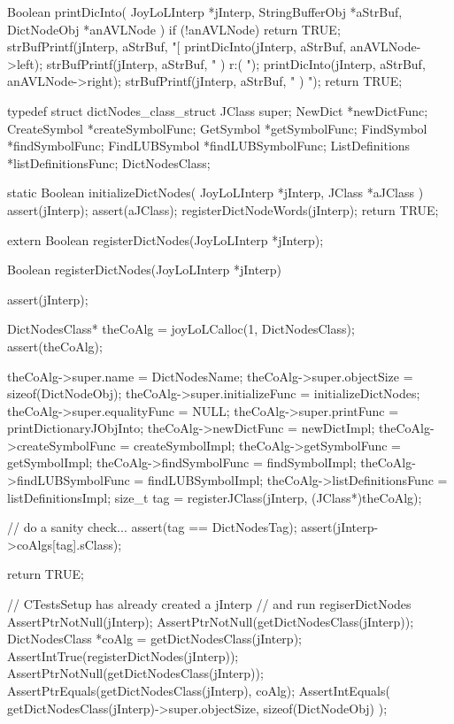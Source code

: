 Boolean printDicInto(
  JoyLoLInterp    *jInterp,
  StringBufferObj *aStrBuf,
  DictNodeObj         *anAVLNode
) {
  if (!anAVLNode) return TRUE;
  strBufPrintf(jInterp, aStrBuf, "[%
  printDicInto(jInterp, aStrBuf, anAVLNode->left);
  strBufPrintf(jInterp, aStrBuf, " ) r:( ");
  printDicInto(jInterp, aStrBuf, anAVLNode->right);
  strBufPrintf(jInterp, aStrBuf, " ) ");
  return TRUE;
}
\stopCCode

\startTestSuite[registerDictNodes]

\startCHeader
typedef struct dictNodes_class_struct {
  JClass super;
  NewDict         *newDictFunc;
  CreateSymbol    *createSymbolFunc;
  GetSymbol       *getSymbolFunc;
  FindSymbol      *findSymbolFunc;
  FindLUBSymbol   *findLUBSymbolFunc;
  ListDefinitions *listDefinitionsFunc;
} DictNodesClass;
\stopCHeader

\startCCode
static Boolean initializeDictNodes(
  JoyLoLInterp *jInterp,
  JClass   *aJClass
) {
  assert(jInterp);
  assert(aJClass);
  registerDictNodeWords(jInterp);
  return TRUE;
}
\stopCCode

\startCHeader
extern Boolean registerDictNodes(JoyLoLInterp *jInterp);
\stopCHeader
{}

\startCCode
Boolean registerDictNodes(JoyLoLInterp *jInterp) {
  assert(jInterp);
  
  DictNodesClass* theCoAlg =
    joyLoLCalloc(1, DictNodesClass);
  assert(theCoAlg);
  
  theCoAlg->super.name            = DictNodesName;
  theCoAlg->super.objectSize      = sizeof(DictNodeObj);
  theCoAlg->super.initializeFunc  = initializeDictNodes;
  theCoAlg->super.equalityFunc    = NULL;
  theCoAlg->super.printFunc       = printDictionaryJObjInto;
  theCoAlg->newDictFunc           = newDictImpl;
  theCoAlg->createSymbolFunc      = createSymbolImpl;
  theCoAlg->getSymbolFunc         = getSymbolImpl;
  theCoAlg->findSymbolFunc        = findSymbolImpl;
  theCoAlg->findLUBSymbolFunc     = findLUBSymbolImpl;
  theCoAlg->listDefinitionsFunc   = listDefinitionsImpl;
  size_t tag =
    registerJClass(jInterp, (JClass*)theCoAlg);
  
  // do a sanity check...
  assert(tag == DictNodesTag);
  assert(jInterp->coAlgs[tag].sClass);
    
  return TRUE;
}
\stopCCode


\startCTest
  // CTestsSetup has already created a jInterp
  // and run regiserDictNodes
  AssertPtrNotNull(jInterp);
  AssertPtrNotNull(getDictNodesClass(jInterp));
  DictNodesClass *coAlg =
    getDictNodesClass(jInterp);
  AssertIntTrue(registerDictNodes(jInterp));
  AssertPtrNotNull(getDictNodesClass(jInterp));
  AssertPtrEquals(getDictNodesClass(jInterp), coAlg);
  AssertIntEquals(
    getDictNodesClass(jInterp)->super.objectSize, 
    sizeof(DictNodeObj)
  );
\stopCTest
\stopTestCase
\stopTestSuite


